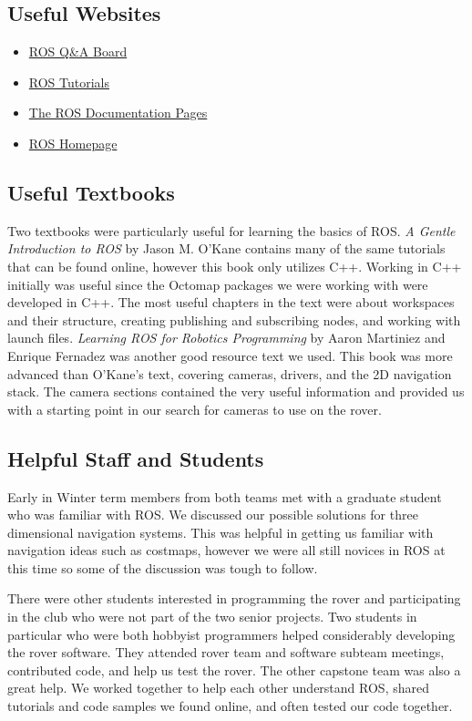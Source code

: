 \documentclass[10pt, oneside,onecolumn]{IEEEtran}
\begin{document}
\begin{titlepage}
\subsection{Useful Websites}
\begin{itemize}
\item \href{http://answers.ros.org/questions/}{ROS Q\&A Board}
\item \href{http://wiki.ros.org/ROS/Tutorials}{ROS Tutorials}
\item \href{http://wiki.ros.org/}{The ROS Documentation Pages}
\item \href{http://www.ros.org/}{ROS Homepage}
\end{itemize}

\subsection{Useful Textbooks}
Two textbooks were particularly useful for learning the basics of ROS. \textit{A Gentle Introduction to ROS} by Jason M. O’Kane contains many of the same tutorials that can be found online, however this book only utilizes C++. Working in C++ initially was useful since the Octomap packages we were working with were developed in C++. The most useful chapters in the text were about workspaces and their structure, creating publishing and subscribing nodes, and working with launch files. 
\textit{Learning ROS for Robotics Programming} by Aaron Martiniez and Enrique Fernadez was another good resource text we used. This book was more advanced than O'Kane's text, covering cameras, drivers, and the 2D navigation stack. The camera sections contained the very useful information and provided us with a starting point in our search for cameras to use on the rover. 

\subsection{Helpful Staff and Students}
Early in Winter term members from both teams met with a graduate student who was familiar with ROS. We discussed our possible solutions for three dimensional navigation systems. This was helpful in getting us familiar with navigation ideas such as costmaps, however we were all still novices in ROS at this time so some of the discussion was tough to follow. 

There were other students interested in programming the rover and participating in the club who were not part of the two senior projects. Two students in particular who were both hobbyist programmers helped considerably developing the rover software. They attended rover team and software subteam meetings, contributed code, and help us test the rover. The other capstone team was also a great help. We worked together to help each other understand ROS, shared tutorials and code samples we found online, and often tested our code together.


\end{titlepage}
\end{document}
